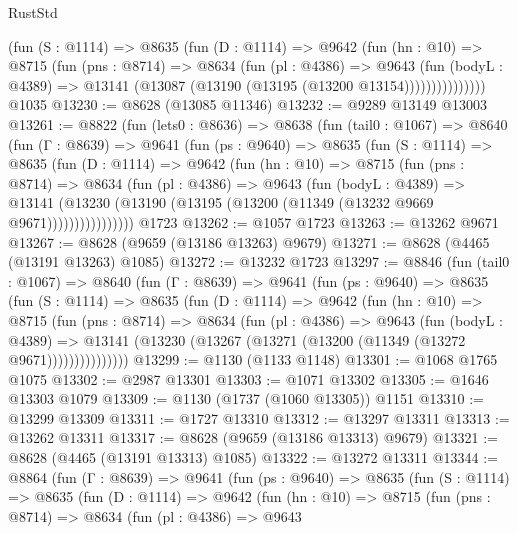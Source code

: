 \begin{lexlean}{RustStd}
\begin{coremodule}
              (fun (S : @1114) =>
              @8635
                (fun (D : @1114) =>
                @9642
                  (fun (hn : @10) =>
                  @8715
                    (fun (pns : @8714) =>
                    @8634
                      (fun (pl : @4386) =>
                      @9643
                        (fun (bodyL : @4389) =>
                        @13141 (@13087 (@13190 (@13195 (@13200 @13154)))))))))))))))
    @1035
@13230 := @8628 (@13085 @11346)
@13232 := @9289 @13149 @13003
@13261 := @8822
    (fun (lets0 : @8636) =>
    @8638
      (fun (tail0 : @1067) =>
      @8640
        (fun (Γ : @8639) =>
        @9641
          (fun (ps : @9640) =>
          @8635
            (fun (S : @1114) =>
            @8635
              (fun (D : @1114) =>
              @9642
                (fun (hn : @10) =>
                @8715
                  (fun (pns : @8714) =>
                  @8634
                    (fun (pl : @4386) =>
                    @9643
                      (fun (bodyL : @4389) =>
                      @13141
                        (@13230 (@13190 (@13195 (@13200 (@11349 (@13232 @9669 @9671))))))))))))))))
    @1723
@13262 := @1057 @1723
@13263 := @13262 @9671
@13267 := @8628 (@9659 (@13186 @13263) @9679)
@13271 := @8628 (@4465 (@13191 @13263) @1085)
@13272 := @13232 @1723
@13297 := @8846
    (fun (tail0 : @1067) =>
    @8640
      (fun (Γ : @8639) =>
      @9641
        (fun (ps : @9640) =>
        @8635
          (fun (S : @1114) =>
          @8635
            (fun (D : @1114) =>
            @9642
              (fun (hn : @10) =>
              @8715
                (fun (pns : @8714) =>
                @8634
                  (fun (pl : @4386) =>
                  @9643
                    (fun (bodyL : @4389) =>
                    @13141 (@13230 (@13267 (@13271 (@13200 (@11349 (@13272 @9671)))))))))))))))
@13299 := @1130 (@1133 @1148)
@13301 := @1068 @1765 @1075
@13302 := @2987 @13301
@13303 := @1071 @13302
@13305 := @1646 @13303 @1079
@13309 := @1130 (@1737 (@1060 @13305)) @1151
@13310 := @13299 @13309
@13311 := @1727 @13310
@13312 := @13297 @13311
@13313 := @13262 @13311
@13317 := @8628 (@9659 (@13186 @13313) @9679)
@13321 := @8628 (@4465 (@13191 @13313) @1085)
@13322 := @13272 @13311
@13344 := @8864
    (fun (Γ : @8639) =>
    @9641
      (fun (ps : @9640) =>
      @8635
        (fun (S : @1114) =>
        @8635
          (fun (D : @1114) =>
          @9642
            (fun (hn : @10) =>
            @8715
              (fun (pns : @8714) =>
              @8634
                (fun (pl : @4386) =>
                @9643

\end{coremodule}
\end{lexlean}
